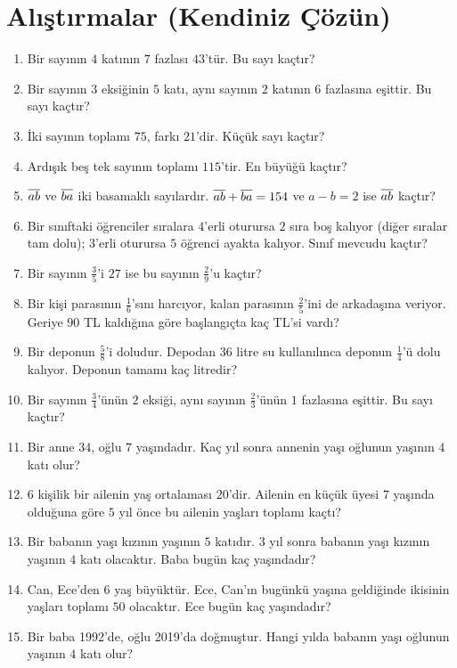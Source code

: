 \kendinizoncesi
\section{Alıştırmalar (Kendiniz Çözün)}

\begin{enumerate}[label=\textbf{\arabic*.},leftmargin=*,itemsep=6pt]
\item Bir sayının \(4\) katının \(7\) fazlası \(43\)'tür. Bu sayı kaçtır?
\item Bir sayının \(3\) eksiğinin \(5\) katı, aynı sayının \(2\) katının \(6\) fazlasına eşittir. Bu sayı kaçtır?
\item İki sayının toplamı \(75\), farkı \(21\)'dir. Küçük sayı kaçtır?
\item Ardışık beş tek sayının toplamı \(115\)'tir. En büyüğü kaçtır?
\item \(\overline{ab}\) ve \(\overline{ba}\) iki basamaklı sayılardır. \(\overline{ab}+\overline{ba}=154\) ve \(a-b=2\) ise \(\overline{ab}\) kaçtır?
\item Bir sınıftaki öğrenciler sıralara \(4\)'erli oturursa \(2\) sıra boş kalıyor (diğer sıralar tam dolu); \(3\)'erli oturursa \(5\) öğrenci ayakta kalıyor. Sınıf mevcudu kaçtır?
\item Bir sayının \(\frac{3}{5}\)'i \(27\) ise bu sayının \(\frac{2}{9}\)'u kaçtır?
\item Bir kişi parasının \(\frac{1}{6}\)'sını harcıyor, kalan parasının \(\frac{2}{5}\)'ini de arkadaşına veriyor. Geriye \(90\) TL kaldığına göre başlangıçta kaç TL'si vardı?
\item Bir deponun \(\frac{5}{8}\)'i doludur. Depodan \(36\) litre su kullanılınca deponun \(\frac{1}{4}\)'ü dolu kalıyor. Deponun tamamı kaç litredir?
\item Bir sayının \(\frac{3}{4}\)'ünün \(2\) eksiği, aynı sayının \(\frac{2}{3}\)'ünün \(1\) fazlasına eşittir. Bu sayı kaçtır?
\item Bir anne \(34\), oğlu \(7\) yaşındadır. Kaç yıl sonra annenin yaşı oğlunun yaşının \(4\) katı olur?
\item \(6\) kişilik bir ailenin yaş ortalaması \(20\)'dir. Ailenin en küçük üyesi \(7\) yaşında olduğuna göre \(5\) yıl önce bu ailenin yaşları toplamı kaçtı?
\item Bir babanın yaşı kızının yaşının \(5\) katıdır. \(3\) yıl sonra babanın yaşı kızının yaşının \(4\) katı olacaktır. Baba bugün kaç yaşındadır?
\item Can, Ece'den \(6\) yaş büyüktür. Ece, Can'ın bugünkü yaşına geldiğinde ikisinin yaşları toplamı \(50\) olacaktır. Ece bugün kaç yaşındadır?
\item Bir baba 1992'de, oğlu 2019'da doğmuştur. Hangi yılda babanın yaşı oğlunun yaşının \(4\) katı olur?
\end{enumerate}

